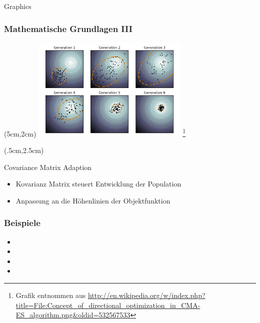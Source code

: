\begin{frame}{Graphics} 
  	\frametitle{Mathematische Grundlagen III}
%  	
  	\begin{textblock*}{7.5cm}(5cm,2cm) %
  		\includegraphics[width=7.5cm]{../img/Concept_of_directional_optimization_in_CMA-ES_algorithm.png}
  		\footnote{Grafik entnommen aus \url{http://en.wikipedia.org/w/index.php?title=File:Concept_of_directional_optimization_in_CMA-ES_algorithm.png&oldid=532567533}}
  	\end{textblock*}
%  	
	\begin{textblock*}{4cm}(.5cm,2.5cm) %
		\small
		\begin{cmaes} 
			Covariance Matrix Adaption
		\end{cmaes}
		\small		
  		\begin{itemize}
  	
  		\item Kovarianz Matrix steuert Entwicklung der Population
  		\item Anpassung an die Höhenlinien der Objektfunktion
%  		
  		\end{itemize}
  	\end{textblock*}
%  	
\end{frame}
\begin{frame} %
  \frametitle{Beispiele}
%  
  \begin{itemize}
	\item{}
	\item{}
	\item{}
	\item{}
  \end{itemize}
%  
\end{frame}

